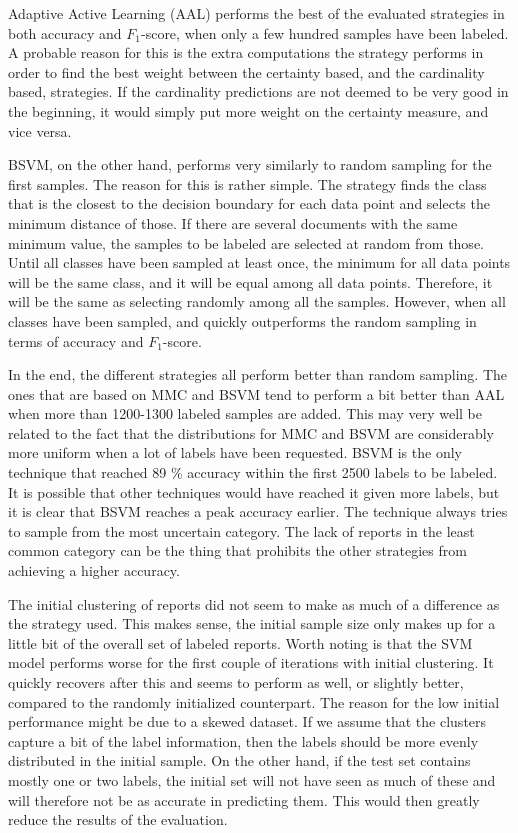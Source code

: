 Adaptive Active Learning (AAL) performs the best of the evaluated strategies in both accuracy and $F_1$-score, when only a few hundred samples have been labeled. 
A probable reason for this is the extra computations the strategy performs in order to find the best weight between the certainty based, and the cardinality based, strategies.
If the cardinality predictions are not deemed to be very good in the beginning, it would simply put more weight on the certainty measure, and vice versa.

BSVM, on the other hand, performs very similarly to random sampling for the first samples.
The reason for this is rather simple.
The strategy finds the class that is the closest to the decision boundary for each data point and selects the minimum distance of those.
If there are several documents with the same minimum value, the samples to be labeled are selected at random from those.
Until all classes have been sampled at least once, the minimum for all data points will be the same class, and it will be equal among all data points.
Therefore, it will be the same as selecting randomly among all the samples.
However, when all classes have been sampled, and quickly outperforms the random sampling in terms of accuracy and $F_1$-score.

In the end, the different strategies all perform better than random sampling.
The ones that are based on MMC and BSVM tend to perform a bit better than AAL when more than 1200-1300 labeled samples are added.
This may very well be related to the fact that the distributions for MMC and BSVM are considerably more uniform when a lot of labels have been requested.
BSVM is the only technique that reached 89 \% accuracy within the first 2500 labels to be labeled.
It is possible that other techniques would have reached it given more labels, but it is clear that BSVM reaches a peak accuracy earlier.
The technique always tries to sample from the most uncertain category.
The lack of reports in the least common category can be the thing that prohibits the other strategies from achieving a higher accuracy.

The initial clustering of reports did not seem to make as much of a difference as the strategy used.
This makes sense, the initial sample size only makes up for a little bit of the overall set of labeled reports.
Worth noting is that the SVM model performs worse for the first couple of iterations with initial clustering.
It quickly recovers after this and seems to perform as well, or slightly better, compared to the randomly initialized counterpart.
The reason for the low initial performance might be due to a skewed dataset.
If we assume that the clusters capture a bit of the label information, then the labels should be more evenly distributed in the initial sample.
On the other hand, if the test set contains mostly one or two labels, the initial set will not have seen as much of these and will therefore not be as accurate in predicting them.
This would then greatly reduce the results of the evaluation.

